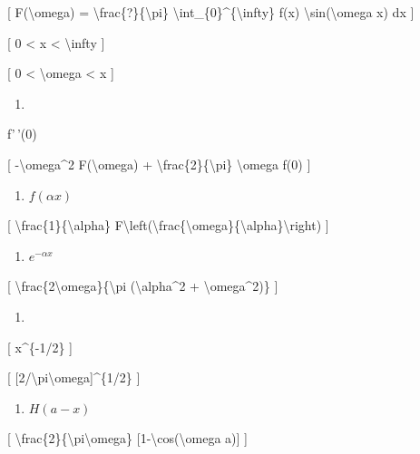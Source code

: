 \documentclass[
]{article}
\providecommand{\tightlist}{%
  \setlength{\itemsep}{0pt}\setlength{\parskip}{0pt}}
\begin{document}
{[} F(\textbackslash omega) =
\textbackslash frac\{?\}\{\textbackslash pi\}
\textbackslash int\_\{0\}\^{}\{\textbackslash infty\} f(x)
\textbackslash sin(\textbackslash omega x) dx {]}

{[} 0 \textless{} x \textless{} \textbackslash infty {]}

{[} 0 \textless{} \textbackslash omega \textless{} x {]}

\begin{enumerate}
\def\labelenumi{\arabic{enumi}.}
\tightlist
\item
\end{enumerate}

f'\,'(0)

{[} -\textbackslash omega\^{}2 F(\textbackslash omega) +
\textbackslash frac\{2\}\{\textbackslash pi\} \textbackslash omega f(0)
{]}

\begin{enumerate}
\def\labelenumi{\arabic{enumi}.}
\setcounter{enumi}{1}
\tightlist
\item
  \(f(\alpha x)\)
\end{enumerate}

{[} \textbackslash frac\{1\}\{\textbackslash alpha\}
F\textbackslash left(\textbackslash frac\{\textbackslash omega\}\{\textbackslash alpha\}\textbackslash right)
{]}

\begin{enumerate}
\def\labelenumi{\arabic{enumi}.}
\setcounter{enumi}{2}
\tightlist
\item
  \(e^{-\alpha x}\)
\end{enumerate}

{[} \textbackslash frac\{2\textbackslash omega\}\{\textbackslash pi
(\textbackslash alpha\^{}2 + \textbackslash omega\^{}2)\} {]}

\begin{enumerate}
\def\labelenumi{\arabic{enumi}.}
\setcounter{enumi}{3}
\tightlist
\item
\end{enumerate}

{[} x\^{}\{-1/2\} {]}

{[} {[}2/\textbackslash pi\textbackslash omega{]}\^{}\{1/2\} {]}

\begin{enumerate}
\def\labelenumi{\arabic{enumi}.}
\setcounter{enumi}{4}
\tightlist
\item
  \(H(a-x)\)
\end{enumerate}

{[} \textbackslash frac\{2\}\{\textbackslash pi\textbackslash omega\}
{[}1-\textbackslash cos(\textbackslash omega a){]} {]}
\end{document}
